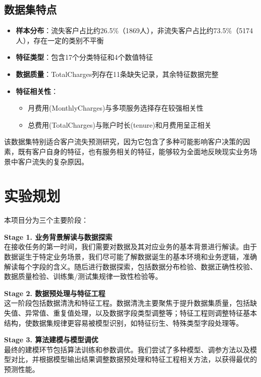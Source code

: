 \documentclass{article}
\begin{document}
\subsection{数据集特点}
\begin{itemize}
    \item \textbf{样本分布}：流失客户占比约26.5\%（1869人），非流失客户占比约73.5\%（5174人），存在一定的类别不平衡
    \item \textbf{特征类型}：包含17个分类特征和4个数值特征
    \item \textbf{数据质量}：TotalCharges列存在11条缺失记录，其余特征数据完整
   \item \textbf{特征相关性}：
  \begin{itemize}[noitemsep,leftmargin=*]
    \item 月费用(MonthlyCharges)与多项服务选择存在较强相关性
    \item 总费用(TotalCharges)与账户时长(tenure)和月费用呈正相关
  \end{itemize}
\end{itemize}

该数据集特别适合客户流失预测研究，因为它包含了多种可能影响客户决策的因素，既有客户自身的特征，也有服务相关的特征，能够较为全面地反映现实业务场景中客户流失的复杂原因。

\section{实验规划}

本项目分为三个主要阶段：

\textbf{Stage 1. 业务背景解读与数据探索}\\
在接收任务的第一时间，我们需要对数据及其对应业务的基本背景进行解读。由于数据诞生于特定业务场景，我们尽可能了解数据诞生的基本环境和业务逻辑，准确解读每个字段的含义。随后进行数据探索，包括数据分布检验、数据正确性校验、数据质量检验、训练集/测试集规律一致性检验等。

\textbf{Stage 2. 数据预处理与特征工程}\\
这一阶段包括数据清洗和特征工程。数据清洗主要聚焦于提升数据集质量，包括缺失值、异常值、重复值处理，以及数据字段类型调整等；特征工程则调整特征基本结构，使数据集规律更容易被模型识别，如特征衍生、特殊类型字段处理等。

\textbf{Stage 3. 算法建模与模型调优}\\
最终的建模环节包括算法训练和参数调优。我们尝试了多种模型、调参方法以及模型对比，并根据模型输出结果调整数据预处理和特征工程相关方法，以获得最优的预测性能。
\end{document}
